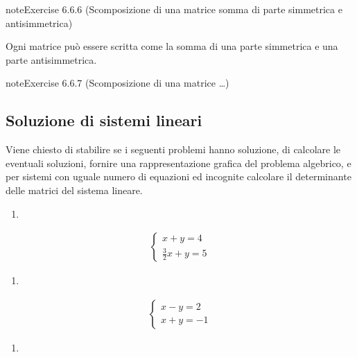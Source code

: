 \documentclass[letterpaper,10pt,italian]{jupyterBook}
\begin{document}
\begin{sphinxadmonition}{note}{Exercise 6.6.6 (Scomposizione di una matrice \sphinxhyphen{} somma di parte simmetrica e antisimmetrica)}



\sphinxAtStartPar
Ogni matrice può essere scritta come la somma di una parte simmetrica e una parte antisimmetrica.
\end{sphinxadmonition}
 \label{exercise:ch/algebra/linear-algebra-exercise-13}

\begin{sphinxadmonition}{note}{Exercise 6.6.7 (Scomposizione di una matrice \sphinxhyphen{} …)}


\end{sphinxadmonition}


\subsection{Soluzione di sistemi lineari}
\label{\detokenize{ch/algebra/linear-algebra:soluzione-di-sistemi-lineari}}\label{\detokenize{ch/algebra/linear-algebra:math-hs-algebra-linear-problems-linear-sys}}
\sphinxAtStartPar
Viene chiesto di stabilire se i seguenti problemi hanno soluzione, di calcolare le eventuali soluzioni, fornire una rappresentazione grafica del problema algebrico, e \sphinxhyphen{} per sistemi con uguale numero di equazioni ed incognite \sphinxhyphen{} calcolare il determinante delle matrici del sistema lineare.
\begin{enumerate}
%
\item {} 
\end{enumerate}
\begin{equation*}
\begin{split}
   \begin{cases}
   x + y = 4 \\
   \frac{3}{2}x + y = 5
   \end{cases}
\end{split}
\end{equation*}\begin{enumerate}
%
\setcounter{enumi}{1}
\item {} 
\end{enumerate}
\begin{equation*}
\begin{split}
    \begin{cases}
    x - y = 2 \\
    x + y = -1
    \end{cases}
\end{split}
\end{equation*}\begin{enumerate}
%
\setcounter{enumi}{2}
\item {} 
\end{enumerate}
\end{document}
